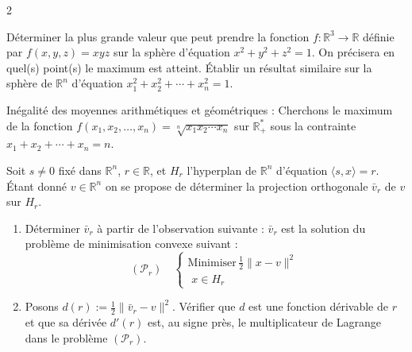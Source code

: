 \begin{multicols}{2}
\begin{exercice}
	Déterminer la plus grande valeur que peut prendre la fonction $f : \mathbb{R}^{3} \rightarrow \mathbb{R}$ définie par $f(x, y, z) = xyz$ sur la sphère d'équation $x^{2} + y^{2} + z^{2} = 1$. On précisera en quel(s) point(s) le maximum est atteint. Établir un résultat similaire sur la sphère de $\mathbb{R}^{n}$ d'équation $x_{1}^{2} + x_{2}^{2} + \cdots + x_{n}^{2} = 1$.
\end{exercice}

\begin{exercice}
	Inégalité des moyennes arithmétiques et géométriques : Cherchons le maximum de la fonction $f(x_{1}, x_{2}, \ldots, x_{n}) = \sqrt[n]{x_{1} x_{2} \cdots x_{n}}$ sur $\mathbb{R}_{+}^{*}$ sous la contrainte $x_{1} + x_{2} + \cdots + x_{n} = n$.
\end{exercice}

\begin{exercice}
	Soit $s \neq 0$ fixé dans $\mathbb{R}^{n}$, $r \in \mathbb{R}$, et $H_{r}$ l'hyperplan de $\mathbb{R}^{n}$ d'équation $\langle s, x \rangle = r$. Étant donné $v \in \mathbb{R}^{n}$ on se propose de déterminer la projection orthogonale $\bar{v}_{r}$ de $v$ sur $H_{r}$.
	\begin{enumerate}[label=\arabic*.]
		\item Déterminer $\bar{v}_{r}$ à partir de l'observation suivante : $\bar{v}_{r}$ est la solution du problème de minimisation convexe suivant :
		\[
		(\mathcal{P}_{r}) \quad
		\begin{cases}
		\text{Minimiser} \, \frac{1}{2} \|x - v\|^{2} \\
		\,\, x \in H_{r}
		\end{cases}
		\]
		\item Posons $d(r) := \frac{1}{2} \|\bar{v}_{r} - v\|^{2}$. Vérifier que $d$ est une fonction dérivable de $r$ et que sa dérivée $d'(r)$ est, au signe près, le multiplicateur de Lagrange dans le problème $(\mathcal{P}_{r})$.
	\end{enumerate}
\end{exercice}


\end{multicols}
